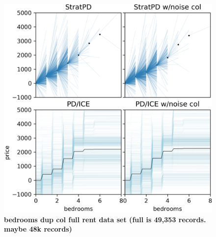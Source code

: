 \documentclass[12pt]{article}
\begin{document}
\begin{figure}[htbp]
\begin{center}
\includegraphics[scale=0.6]{images/bedrooms_vs_price_noise.png}
\caption{{\bf  bedrooms dup col full rent data set (full is 49,353 records. maybe 48k records)}}
\label{fig:beds_noise}
\end{center}
\end{figure}
\end{document}
